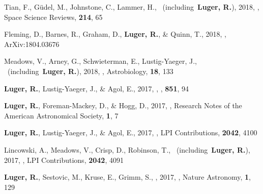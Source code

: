 \item[{\color{numcolor}\scriptsize---}] Tian, F., G{\"u}del, M., Johnstone, C., Lammer, H., \etal\ (including\ \textbf{Luger, R.}), 2018, , Space Science Reviews, \textbf{214}, 65

\item[{\color{numcolor}\scriptsize---}] Fleming, D., Barnes, R., Graham, D., \textbf{Luger, R.}, \& Quinn, T., 2018, , ArXiv:1804.03676

\item[{\color{numcolor}\scriptsize---}] Meadows, V., Arney, G., Schwieterman, E., Lustig-Yaeger, J., \etal\ (including\ \textbf{Luger, R.}), 2018, , Astrobiology, \textbf{18}, 133

\item[{\color{numcolor}\scriptsize2}] \textbf{Luger, R.}, Lustig-Yaeger, J., \& Agol, E., 2017, , \apj, \textbf{851}, 94

\item[{\color{numcolor}\scriptsize---}] \textbf{Luger, R.}, Foreman-Mackey, D., \& Hogg, D., 2017, , Research Notes of the American Astronomical Society, \textbf{1}, 7

\item[{\color{numcolor}\scriptsize---}] \textbf{Luger, R.}, Lustig-Yaeger, J., \& Agol, E., 2017, , LPI Contributions, \textbf{2042}, 4100

\item[{\color{numcolor}\scriptsize---}] Lincowski, A., Meadows, V., Crisp, D., Robinson, T., \etal\ (including\ \textbf{Luger, R.}), 2017, , LPI Contributions, \textbf{2042}, 4091

\item[{\color{numcolor}\scriptsize38}] \textbf{Luger, R.}, Sestovic, M., Kruse, E., Grimm, S., \etal, 2017, , Nature Astronomy, \textbf{1}, 129

